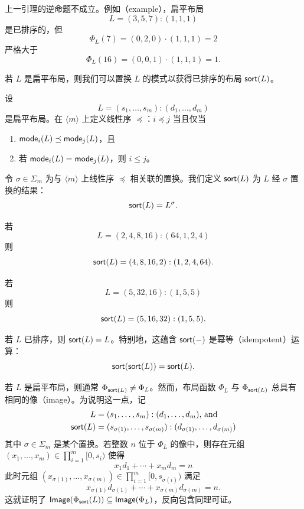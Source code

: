 \begin{remark}
    上一引理的逆命题不成立。例如（example），扁平布局
    \[L = (3,5,7):(1,1,1)\]
    是已排序的，但
    \[
    \Phi_L(7) = (0,2,0) \cdot (1,1,1) = 2
    \]
    严格大于
    \[\Phi_L(16) = (0,0,1)\cdot(1,1,1) = 1.
    \]
\end{remark}

若 $L$ 是扁平布局，则我们可以置换 $L$ 的模式以获得已排序的布局 $\mathsf{sort}(L)$。

\begin{construction}
    设
    \[L = (s_1,\dots,s_m):(d_1,\dots,d_m)\]
    是扁平布局。在 $\langle m \rangle$ 上定义线性序 $\preceq$：$i \preceq j$ 当且仅当
    \begin{enumerate}
        \item $\mathsf{mode}_i(L) \preceq \mathsf{mode}_j(L)$，且
        \item 若 $\mathsf{mode}_i(L) = \mathsf{mode}_j(L)$，则 $i \leq j$。
    \end{enumerate}
    令 $\sigma \in \Sigma_m$ 为与 $\langle m \rangle$ 上线性序 $\preceq$ 相关联的置换。我们定义 $\mathsf{sort}(L)$ 为 $L$ 经 $\sigma$ 置换的结果：
    \[
    \mathsf{sort}(L) = L^\sigma.
    \]
\end{construction}

\begin{example}
    若
    \[L = (2,4,8,16):(64,1,2,4)\]
    则
    \[\mathsf{sort}(L) = (4,8,16,2):(1,2,4,64).\]
\end{example}
\begin{example}
若
\[L = (5,32,16):(1,5,5)\]
则
\[
    \mathsf{sort}(L) = (5,16,32):(1,5,5).
\]
\end{example}
\begin{example}
    若 $L$ 已排序，则 $\mathsf{sort}(L) = L$。特别地，这蕴含 $\mathsf{sort}(-)$ 是幂等（idempotent）运算：
    \[
    \mathsf{sort}(\mathsf{sort}(L)) = \mathsf{sort}(L).
    \]
\end{example}


\begin{observation}
    若 $L$ 是扁平布局，则通常 $\Phi_{\mathsf{sort}(L)} \neq \Phi_{L}$。然而，布局函数 $\Phi_L$ 与 $\Phi_{\mathsf{sort}(L)}$ 总具有相同的像（image）。为说明这一点，记
    \begin{align*} L & = (s_1,\dots,s_m):(d_1,\dots,d_m)\text{, and}\\
    \mathsf{sort}(L) & = (s_{\sigma(1)},\dots,s_{\sigma(m)}):(d_{\sigma(1)},\dots,d_{\sigma(m)})
    \end{align*}
    其中 $\sigma \in \Sigma_m$ 是某个置换。若整数 $n$ 位于 $\Phi_L$ 的像中，则存在元组 $(x_1,\dots,x_m) \in \prod_{i=1}^m {[}0,s_i{)}$ 使得
    \[
    x_1d_1 + \cdots + x_m d_m = n
    \]
    此时元组 $(x_{\sigma(1)},\dots,x_{\sigma(m)}) \in \prod_{i=1}^m {[}0,s_{\sigma(i)}{)}$ 满足
    \[
    x_{\sigma(1)}d_{\sigma(1)} + \cdots + x_{\sigma(m)}d_{\sigma(m)} = n.
    \]
    这就证明了 $\mathsf{Image}(\Phi_{\mathsf{sort}}(L)) \subseteq \mathsf{Image}(\Phi_L)$，反向包含同理可证。
\end{observation}

